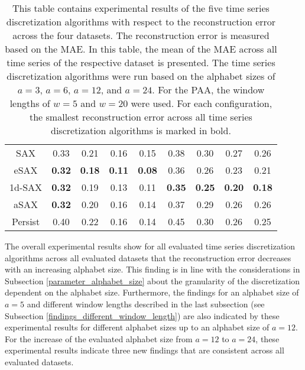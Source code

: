 \begin{table}[H]
\begin{tabular}{ccccccccc}
\ac{SAX} & 0.33 & 0.21 & 0.16 & 0.15 & 0.38 & 0.30 & 0.27 & 0.26 \\
\ac{eSAX} & \textbf{0.32} & \textbf{0.18} & \textbf{0.11} & \textbf{0.08} & 0.36 & 0.26 & 0.23 & 0.21 \\
\ac{1d-SAX} & \textbf{0.32} & 0.19 & 0.13 & 0.11 & \textbf{0.35} & \textbf{0.25} & \textbf{0.20} & \textbf{0.18} \\
\ac{aSAX} & \textbf{0.32} & 0.20 & 0.16 & 0.14 & 0.37 & 0.29 & 0.26 & 0.26 \\
Persist & 0.40 & 0.22 & 0.16 & 0.14 & 0.45 & 0.30 & 0.26 & 0.25 \\
\bottomrule
\end{tabular}
\vspace*{0.5cm}
\caption[Reconstruction Error - Evaluation: Alphabet Size]{This table contains experimental results of the five time series discretization algorithms with respect to the reconstruction error across the four datasets. The reconstruction error is measured based on the \ac{MAE}. In this table, the mean of the \ac{MAE} across all time series of the respective dataset is presented. The time series discretization algorithms were run based on the alphabet sizes of $a = 3$, $a = 6$, $a = 12$, and $a = 24$. For the \ac{PAA}, the window lengths of $w = 5$ and $w = 20$ were used. For each configuration, the smallest reconstruction error across all time series discretization algorithms is marked in bold.}
\label{tab:recon_error_alphabet_size}
\end{table}
The overall experimental results show for all evaluated time series discretization algorithms across all evaluated datasets that the reconstruction error decreases with an increasing alphabet size. This finding is in line with the considerations in Subsection \ref{parameter_alphabet_size} about the granularity of the discretization dependent on the alphabet size. Furthermore, the findings for an alphabet size of $a = 5$ and different window lengths described in the last subsection (see Subsection \ref{findings_different_window_length}) are also indicated by these experimental results for different alphabet sizes up to an alphabet size of $a = 12$. For the increase of the evaluated alphabet size from $a = 12$ to $a = 24$, these experimental results indicate three new findings that are consistent across all evaluated datasets. \newline
